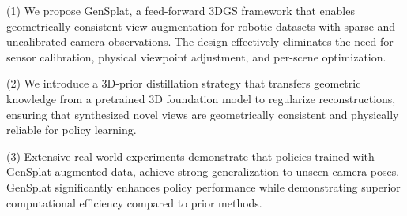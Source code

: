 (1) We propose GenSplat, a feed-forward 3DGS framework that enables geometrically consistent view augmentation for robotic datasets with sparse and uncalibrated camera observations. The design effectively eliminates the need for sensor calibration, physical viewpoint adjustment, and per-scene optimization.
    
(2) We introduce a 3D-prior distillation strategy that transfers geometric knowledge from a pretrained 3D foundation model to regularize reconstructions, ensuring that synthesized novel views are geometrically consistent and physically reliable for policy learning.

(3) Extensive real-world experiments demonstrate that policies trained with GenSplat-augmented data, achieve strong generalization to unseen camera poses. GenSplat significantly enhances policy performance while demonstrating superior computational efficiency compared to prior methods.

